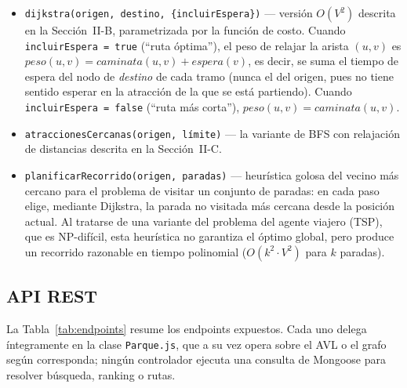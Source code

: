 \documentclass[conference]{IEEEtran}
\begin{document}
\begin{itemize}
  \item \texttt{dijkstra(origen, destino, \{incluirEspera\})} --- versi\'on
    $O(V^2)$ descrita en la Secci\'on~II-B, parametrizada por la funci\'on de
    costo. Cuando \texttt{incluirEspera = true} (``ruta \'optima''), el peso
    de relajar la arista $(u,v)$ es
    $peso(u,v) = caminata(u,v) + espera(v)$, es decir, se suma el tiempo de
    espera del nodo de \emph{destino} de cada tramo (nunca el del origen,
    pues no tiene sentido esperar en la atracci\'on de la que se est\'a
    partiendo). Cuando \texttt{incluirEspera = false} (``ruta m\'as corta''),
    $peso(u,v) = caminata(u,v)$.
  \item \texttt{atraccionesCercanas(origen, l\'imite)} --- la variante de BFS
    con relajaci\'on de distancias descrita en la Secci\'on~II-C.
  \item \texttt{planificarRecorrido(origen, paradas)} --- heur\'istica golosa
    del vecino m\'as cercano para el problema de visitar un conjunto de
    paradas: en cada paso elige, mediante Dijkstra, la parada no visitada m\'as
    cercana desde la posici\'on actual. Al tratarse de una variante del
    problema del agente viajero (TSP), que es NP-dif\'icil, esta heur\'istica
    no garantiza el \'optimo global, pero produce un recorrido razonable en
    tiempo polinomial ($O(k^2 \cdot V^2)$ para $k$ paradas).
\end{itemize}

\subsection{API REST}

La Tabla~\ref{tab:endpoints} resume los endpoints expuestos. Cada uno delega
\'integramente en la clase \texttt{Parque.js}, que a su vez opera sobre el
AVL o el grafo seg\'un corresponda; ning\'un controlador ejecuta una consulta
de Mongoose para resolver b\'usqueda, ranking o rutas.
\end{document}
